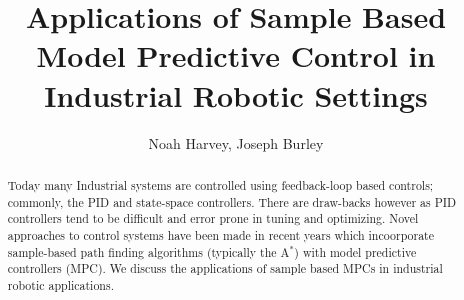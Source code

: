 \documentclass[a4paper,titlepage]{IEEEtran}
\begin{document}
\title{Applications of Sample Based Model Predictive Control in Industrial
	Robotic Settings}
\author{
	Noah Harvey, Joseph Burley
}
\maketitle

\begin{abstract}

	Today many Industrial systems are controlled using feedback-loop based
	controls; commonly, the PID and state-space controllers. There are draw-backs
	however as PID controllers tend to be difficult and error prone in tuning and
	optimizing.  Novel approaches to control systems have been made in recent
	years which incoorporate sample-based path finding algorithms (typically the
	A$^{*}$) with model predictive controllers (MPC). We discuss the applications
	of sample based MPCs in industrial robotic applications.

\end{abstract}








\end{document}
